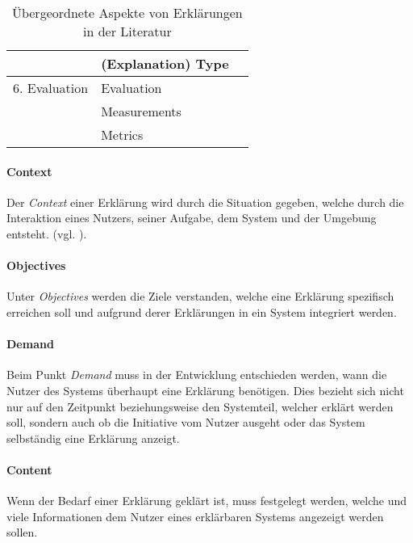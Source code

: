 \begin{table}
\begin{tabular}{|p{}|p{}|p{}|}
                        & (Explanation) Type    & \cite{ribera2019can} \cite{rosenfeld_explainability_2019} \\
        \hline
        6. Evaluation      & Evaluation            & \cite{kohl_explainability_2019} \cite{doshi2017towards} \\
                        & Measurements          & \cite{waa_evaluating_2021} \cite{balog_measuring_2020} \\
                        & Metrics               & \cite{nunes_systematic_2017} \cite{anjomshoae2019explainable}
                                                  \cite{chari_explanation_2020} \cite{waa_evaluating_2021}\\
        \hline
    \end{tabular}
\caption{Übergeordnete Aspekte von Erklärungen in der Literatur}
\label{tab:model_explaination_aspects}
\end{table}

\paragraph{Context} Der \textit{Context} einer Erklärung wird durch die Situation gegeben, welche durch die Interaktion eines Nutzers, seiner Aufgabe, dem System und der Umgebung entsteht. (vgl. \cite{chazette_knowledge_nodate, kohl_explainability_2019}).

\paragraph{Objectives} Unter \textit{Objectives} werden die Ziele verstanden, welche eine Erklärung spezifisch erreichen soll und aufgrund derer Erklärungen in ein System integriert werden.

\paragraph{Demand} Beim Punkt \textit{Demand} muss in der Entwicklung entschieden werden, wann die Nutzer des Systems überhaupt eine Erklärung benötigen. Dies bezieht sich nicht nur auf den Zeitpunkt beziehungsweise den Systemteil, welcher erklärt werden soll, sondern auch ob die Initiative vom Nutzer ausgeht oder das System selbständig eine Erklärung anzeigt.

\paragraph{Content} Wenn der Bedarf einer Erklärung geklärt ist, muss festgelegt werden, welche und viele Informationen dem Nutzer eines erklärbaren Systems angezeigt werden sollen.


